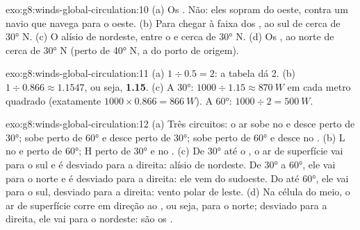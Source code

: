 \begin{solution}{exo:g8:winds-global-circulation:10}
(a) Os . Não: eles sopram do oeste, contra um navio que
navega para o oeste. (b) Para chegar à faixa dos , ao sul de cerca
de \ang{30} N. (c) O alísio de nordeste, entre o  e cerca de
\ang{30} N. (d) Os , ao norte de cerca de \ang{30} N (perto
de \ang{40} N, a  do porto de origem).
\end{solution}

\begin{solution}{exo:g8:winds-global-circulation:11}
(a) $1 \div 0.5 = 2$: a tabela dá 2. (b) $1 \div 0.866 \approx
1.1547$, ou seja, \textbf{1.15}. (c) A \ang{30}: $1000 \div 1.15 \approx
\qty{870}{W}$ em cada metro quadrado (exatamente $1000 \times 0.866 =
\qty{866}{W}$). A \ang{60}: $1000 \div 2 = \qty{500}{W}$.
\end{solution}

\begin{solution}{exo:g8:winds-global-circulation:12}
(a) Três circuitos: o ar sobe no  e desce perto de \ang{30}; sobe
perto de \ang{60} e desce perto de \ang{30}; sobe perto de \ang{60} e desce
no . (b) L no  e perto de \ang{60}; H perto de \ang{30} e no
. (c) De \ang{30} até o , o ar de superfície vai para o sul e
é desviado para a direita: alísio de nordeste. De \ang{30} a \ang{60},
ele vai para o norte e é desviado para a direita: ele vem do sudoeste. Do
 até \ang{60}, ele vai para o sul, desviado para a direita: vento
polar de leste. (d) Na célula do meio, o ar de superfície corre em
direção ao , ou seja, para o norte; desviado para a direita, ele vai
para o nordeste: são os .
\end{solution}

